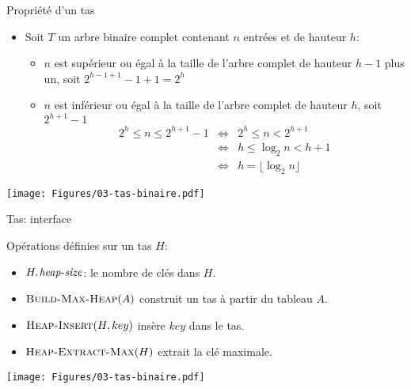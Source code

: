 \begin{frame}{Propriété d'un tas}
\label{03:hauteurtas}
\begin{itemize}
\item Soit $T$ un arbre binaire complet contenant $n$ entrées et de hauteur $h$:
\begin{itemize}
\item $n$ est supérieur ou égal à la taille de l'arbre complet de hauteur $h-1$ plus un, soit $2^{h-1+1}-1+1=2^h$
\item $n$ est inférieur ou égal à la taille de l'arbre complet de hauteur $h$, soit $2^{h+1}-1$
\begin{eqnarray*}
2^h\leq n\leq 2^{h+1}-1 & \Leftrightarrow & 2^h\leq n < 2^{h+1}\\
& \Leftrightarrow & h \leq \log_2 n < h+1 \\
& \Leftrightarrow & h=\lfloor \log_2 n\rfloor
\end{eqnarray*}
\end{itemize}
\end{itemize}

\centerline{\texttt{[image: Figures/03-tas-binaire.pdf]}}

\end{frame}

\begin{frame}{Tas: interface}

Opérations définies sur un tas $H$:
\begin{itemize}
\item $\attrib{H}{heap-size}$: le nombre de clés dans $H$.
\item $\textnormal{\scshape Build-Max-Heap}(A)$ construit un tas à partir du tableau $A$.
\item $\textnormal{\scshape Heap-Insert}(H,key)$ insère $key$ dans le tas.
\item $\textnormal{\scshape Heap-Extract-Max}(H)$ extrait la clé maximale.
\end{itemize}

\bigskip

\centerline{\texttt{[image: Figures/03-tas-binaire.pdf]}}

\end{frame}


